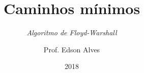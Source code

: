 \title{Caminhos mínimos}
\subtitle{\textit{Algoritmo de Floyd-Warshall}}
\date{2018}
\author{Prof. Edson Alves}
